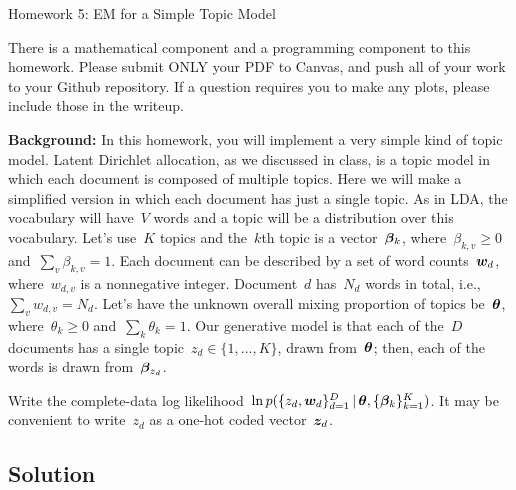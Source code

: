 \documentclass[submit]{harvardml}
\begin{document}
\begin{center}
{\Large Homework 5: EM for a Simple Topic Model}\\
\end{center}

There is a mathematical component and a programming component to this homework.
Please submit ONLY your PDF to Canvas, and push all of your work to your Github
repository. If a question requires you to make any plots, please
include those in the writeup.

\begin{mdframed}[style=exampledefault]
\textbf{Background:} In this homework, you will implement a very simple kind of topic model.  Latent Dirichlet allocation, as we discussed in class, is a topic model in which each document is composed of multiple topics.  Here we will make a simplified version in which each document has just a single topic.  As in LDA, the vocabulary will have~$V$ words and a topic will be a distribution over this vocabulary.  Let's use~$K$ topics and the~$k$th topic is a vector~$\boldsymbol{\beta}_k$, where~${\beta_{k,v}\geq 0}$ and~${\sum_v \beta_{k,v}=1}$.  Each document can be described by a set of word counts~$\boldsymbol{w}_{d}$, where~$w_{d,v}$ is a nonnegative integer.  Document~$d$ has~$N_d$ words in total, i.e.,~${\sum_v w_{d,v}=N_d}$.  Let's have the unknown overall mixing proportion of topics be~$\boldsymbol{\theta}$, where~${\theta_k\geq 0}$ and~${\sum_k\theta_k=1}$.  Our generative model is that each of the~$D$ documents has a single topic~${z_d\in \{1,\ldots,K\}}$, drawn from~$\boldsymbol{\theta}$; then, each of the words is drawn from~$\boldsymbol{\beta}_{z_d}$.

\end{mdframed}

\begin{problem}

Write the complete-data log likelihood~$\ln p(\{z_d,\boldsymbol{w}_d\}^D_{d=1}\,|\,\boldsymbol{\theta}, \{\boldsymbol{\beta}_k\}^K_{k=1})$. It may be convenient to write~$z_d$ as a one-hot coded vector~$\boldsymbol{z}_d$.


\end{problem}
\subsection*{Solution}
\end{document}
